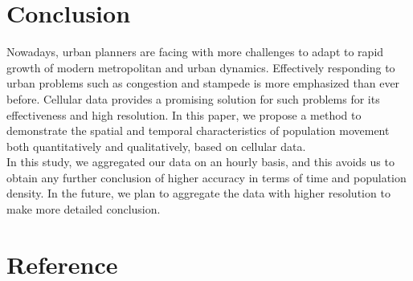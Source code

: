 \documentclass[hidelinks,12pt]{article}
\begin{document}
	\section{Conclusion}\label{sec:con}
	
Nowadays, urban planners are facing with more challenges to adapt to rapid growth of modern metropolitan and urban dynamics. Effectively responding to urban problems such as congestion and stampede is more emphasized than ever before. Cellular data provides a promising solution for such problems for its effectiveness and high resolution. In this paper, we propose a method to demonstrate the spatial and temporal characteristics of population movement both quantitatively and qualitatively, based on cellular data. \\

In this study, we aggregated our data on an hourly basis, and this avoids us to obtain any further conclusion of higher accuracy in terms of time and population density. In the future, we plan to aggregate the data with higher resolution to make more detailed conclusion.
	
	
	
	\section{Reference}\label{sec:ref}
	
	
	\newpage
	\appendix
\end{document}
